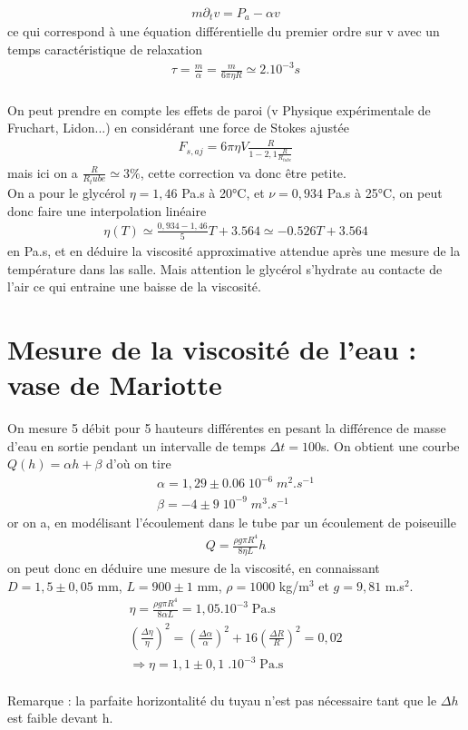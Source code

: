 \documentclass[12pt,prb,aps,epsf]{report}
\begin{document}
\begin{eqnarray}
m\partial_t v = P_a - \alpha v
\end{eqnarray}
ce qui correspond à une équation différentielle du premier ordre sur v avec un temps caractéristique de relaxation 
\begin{eqnarray}
\tau = \frac{m}{\alpha} = \frac{m}{6\pi\eta R} \simeq 2.10^{-3}s
\end{eqnarray}
\\
On peut prendre en compte les effets de paroi (v Physique expérimentale de Fruchart, Lidon...) en considérant une force de Stokes ajustée 
\begin{eqnarray}
F_{s,aj} = 6\pi \eta V \frac{R}{1-2,1\frac{R}{R_{tube}}}
\end{eqnarray}
mais ici on a $\frac{R}{R_tube} \simeq 3\%$, cette correction va donc être petite. \\

On a pour le glycérol $\eta = 1,46$ Pa.s à 20°C, et $\nu = 0,934$ Pa.s à 25°C, on peut donc faire une interpolation linéaire 
\begin{eqnarray}
\eta(T) \simeq \frac{0,934-1,46}{5}T +  3.564 \simeq -0.526T + 3.564 
\end{eqnarray}
en Pa.s, et en déduire la viscosité approximative attendue après une mesure de la température dans las salle. Mais attention le glycérol s'hydrate au contacte de l'air ce qui entraine une baisse de la viscosité.
\section{Mesure de la viscosité de l'eau : vase de Mariotte}
On mesure 5 débit pour 5 hauteurs différentes en pesant la différence de masse d'eau en sortie pendant un intervalle de temps $\Delta t = 100$s. On obtient une courbe $Q(h) = \alpha h + \beta$ d'où on tire
\begin{eqnarray}
\alpha = 1,29\pm 0.06\;10^{-6}\;m^2.s^{-1}\\
\beta = -4\pm 9 \;10^{-9} \;m^3.s^{-1}
\end{eqnarray}
or on a, en modélisant l'écoulement dans le tube par un écoulement de poiseuille
\begin{eqnarray}
Q = \frac{\rho g\pi R^4}{8\eta L}h
\end{eqnarray}
on peut donc en déduire une mesure de la viscosité, en connaissant $D = 1,5 \pm 0,05$ mm, $L=900\pm1$ mm, $\rho = 1000$ kg/m$^3$ et $g= 9,81$ m.s$^2$.
\begin{eqnarray}
\eta = \frac{\rho g\pi R^4}{8\alpha L} = 1,05.10^{-3}\;\mathrm{Pa.s}\\
\left(\frac{\Delta \eta}{\eta}\right)^2 = \left(\frac{\Delta \alpha}{\alpha}\right)^2 + 16\left(\frac{\Delta R}{R}\right)^2 = 0,02\\
\Longrightarrow \eta = 1,1 \pm 0,1 \; .10^{-3}\;\mathrm{Pa.s}
\end{eqnarray}
\\
Remarque : la parfaite horizontalité du tuyau n'est pas nécessaire tant que le $\Delta h$ est faible devant h.\\
\end{document}
